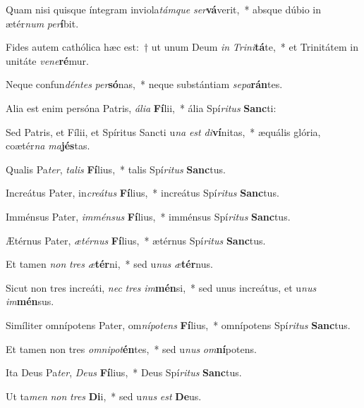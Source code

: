 \item Quam nisi quisque íntegram inviola\textit{tám}\textit{que} \textit{ser}\textbf{vá}verit,~* absque dúbio in ætér\textit{num} \textit{per}\textbf{í}bit.
\item Fides autem cathólica hæc est:~† ut unum Deum \textit{in} \textit{Tri}\textit{ni}\textbf{tá}te,~* et Trinitátem in unitáte \textit{ve}\textit{ne}\textbf{ré}mur.
\item Neque confun\textit{dén}\textit{tes} \textit{per}\textbf{só}nas,~* neque substántiam \textit{se}\textit{pa}\textbf{rán}tes.
\item Alia est enim persóna Patris, \textit{á}\textit{li}\textit{a} \textbf{Fí}lii,~* ália Spí\textit{ri}\textit{tus} \textbf{Sanc}ti:
\item Sed Patris, et Fílii, et Spíritus Sancti u\textit{na} \textit{est} \textit{di}\textbf{ví}nitas,~* æquális glória, coætér\textit{na} \textit{ma}\textbf{jés}tas.
\item Qualis Pa\textit{ter}, \textit{ta}\textit{lis} \textbf{Fí}lius,~* talis Spí\textit{ri}\textit{tus} \textbf{Sanc}tus.
\item Increátus Pater, in\textit{cre}\textit{á}\textit{tus} \textbf{Fí}lius,~* increátus Spí\textit{ri}\textit{tus} \textbf{Sanc}tus.
\item Imménsus Pater, \textit{im}\textit{mén}\textit{sus} \textbf{Fí}lius,~* imménsus Spí\textit{ri}\textit{tus} \textbf{Sanc}tus.
\item Ætérnus Pater, \textit{æ}\textit{tér}\textit{nus} \textbf{Fí}lius,~* ætérnus Spí\textit{ri}\textit{tus} \textbf{Sanc}tus.
\item Et tamen \textit{non} \textit{tres} \textit{æ}\textbf{tér}ni,~* sed u\textit{nus} \textit{æ}\textbf{tér}nus.
\item Sicut non tres increáti, \textit{nec} \textit{tres} \textit{im}\textbf{mén}si,~* sed unus increátus, et u\textit{nus} \textit{im}\textbf{mén}sus.
\item Simíliter omnípotens Pater, om\textit{ní}\textit{pot}\textit{ens} \textbf{Fí}lius,~* omnípotens Spí\textit{ri}\textit{tus} \textbf{Sanc}tus.
\item Et tamen non tres \textit{om}\textit{ni}\textit{pot}\textbf{én}tes,~* sed u\textit{nus} \textit{om}\textbf{ní}potens.
\item Ita Deus Pa\textit{ter}, \textit{De}\textit{us} \textbf{Fí}lius,~* Deus Spí\textit{ri}\textit{tus} \textbf{Sanc}tus.
\item Ut ta\textit{men} \textit{non} \textit{tres} \textbf{Di}i,~* sed u\textit{nus} \textit{est} \textbf{De}us.
